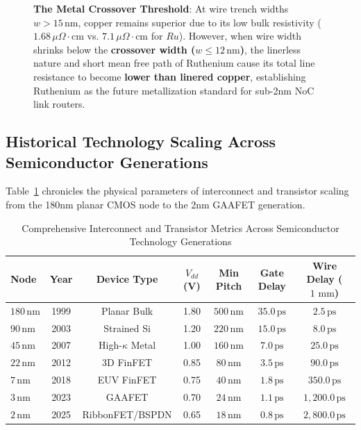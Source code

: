 \begin{figure}[htbp]
\centering
\begin{svgraybox}
\textbf{The Metal Crossover Threshold}: At wire trench widths $w > 15\,\mathrm{nm}$, copper remains superior due to its low bulk resistivity ($1.68\,\mu\Omega\cdot\mathrm{cm}$ vs. $7.1\,\mu\Omega\cdot\mathrm{cm}$ for $Ru$). However, when wire width shrinks below the \textbf{crossover width ($w \le 12\,\mathrm{nm}$)}, the linerless nature and short mean free path of Ruthenium cause its total line resistance to become \textbf{lower than linered copper}, establishing Ruthenium as the future metallization standard for sub-2nm NoC link routers.
\end{svgraybox}
\end{figure}

\subsection{Historical Technology Scaling Across Semiconductor Generations}
\label{subsec:ch1_scaling_table}

Table~\ref{tab:ch1_history} chronicles the physical parameters of interconnect and transistor scaling from the 180nm planar CMOS node to the 2nm GAAFET generation.

\begin{table}[htbp]
\centering
\caption{Comprehensive Interconnect and Transistor Metrics Across Semiconductor Technology Generations}
\label{tab:ch1_history}
\begin{tabular}{lcccccc}
\toprule
\textbf{Node} & \textbf{Year} & \textbf{Device Type} & \textbf{$V_{dd}$ (V)} & \textbf{Min Pitch} & \textbf{Gate Delay} & \textbf{Wire Delay ($1\text{ mm}$)} \\
\midrule
$180\,\mathrm{nm}$ & 1999 & Planar Bulk & 1.80 & $500\,\mathrm{nm}$ & $35.0\,\mathrm{ps}$ & $2.5\,\mathrm{ps}$ \\
$90\,\mathrm{nm}$  & 2003 & Strained Si & 1.20 & $220\,\mathrm{nm}$ & $15.0\,\mathrm{ps}$ & $8.0\,\mathrm{ps}$ \\
$45\,\mathrm{nm}$  & 2007 & High-$\kappa$ Metal & 1.00 & $160\,\mathrm{nm}$ & $7.0\,\mathrm{ps}$  & $25.0\,\mathrm{ps}$ \\
$22\,\mathrm{nm}$  & 2012 & 3D FinFET   & 0.85 & $80\,\mathrm{nm}$  & $3.5\,\mathrm{ps}$  & $90.0\,\mathrm{ps}$ \\
$7\,\mathrm{nm}$   & 2018 & EUV FinFET  & 0.75 & $40\,\mathrm{nm}$  & $1.8\,\mathrm{ps}$  & $350.0\,\mathrm{ps}$ \\
$3\,\mathrm{nm}$   & 2023 & GAAFET      & 0.70 & $24\,\mathrm{nm}$  & $1.1\,\mathrm{ps}$  & $1{,}200.0\,\mathrm{ps}$ \\
$2\,\mathrm{nm}$   & 2025 & RibbonFET/BSPDN & 0.65 & $18\,\mathrm{nm}$ & $0.8\,\mathrm{ps}$  & $2{,}800.0\,\mathrm{ps}$ \\
\bottomrule
\end{tabular}
\end{table}

